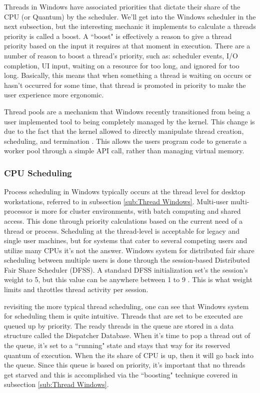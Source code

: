 \documentclass[10pt,draftclsnofoot,onecolumn]{IEEEtran}
\begin{document}
\par Threads in Windows have associated priorities that dictate their share of the CPU (or Quantum) by the scheduler.
We'll get into the Windows scheduler in the next subsection, but the interesting mechanic it implements to calculate a threads priority is called a boost.
A ``boost" is effectively a reason to give a thread priority based on the input it requires at that moment in execution.
There are a number of reason to boost a thread's priority, such as: scheduler events, I/O completion, UI input, waiting on a resource for too long, and ignored for too long.
Basically, this means that when something a thread is waiting on occurs or hasn't occurred for some time, that thread is promoted in priority to make the user experience more ergonomic.

\par Thread pools are a mechanism that Windows recently transitioned from being a user implemented tool to being completely managed by the kernel.
This change is due to the fact that the kernel allowed to directly manipulate thread creation, scheduling, and termination \cite{win:1}.
This allows the users program code to generate a worker pool through a simple API call, rather than managing virtual memory.

\subsubsection{CPU Scheduling}
\label{sub:CPU Scheduling Windows}
\par Process scheduling in Windows typically occurs at the thread level for desktop workstations, referred to in subsection \ref{sub:Thread Windows}.
Multi-user multi-processor is more for cluster environments, with batch computing and shared access.
This done through priority calculations based on the current need of a thread or process.
Scheduling at the thread-level is acceptable for legacy and single user machines, but for systems that cater to several competing users and utilize many CPUs it's not the answer.
Windows system for distributed fair share scheduling between multiple users is done through the session-based Distributed Fair Share Scheduler (DFSS).
A standard DFSS initialization set's the session's weight to 5, but this value can be anywhere between 1 to 9 \cite{win:1}.
This is what weight limits and throttles thread activity per session.

\par revisiting the more typical thread scheduling, one can see that Windows system for scheduling them is quite intuitive.
Threads that are set to be executed are queued up by priority.
The ready threads in the queue are stored in a data structure called the Dispatcher Database.
When it's time to pop a thread out of the queue, it's set to a ``running" state and stays that way for its reserved quantum of execution.
When the its share of CPU is up, then it will go back into the queue.
Since this queue is based on priority, it's important that no threads get starved and this is accomplished via the ``boosting" technique covered in subsection \ref{sub:Thread Windows}.
\end{document}
